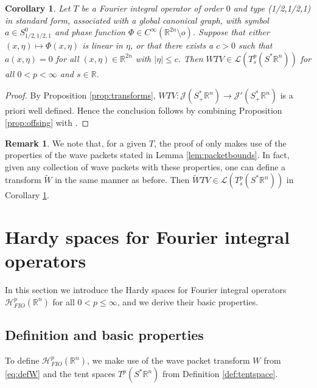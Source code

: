 \documentclass{amsart}
\newcommand {\Hp}{\mathcal{H}^{p}_{FIO}(\Rn)}
\newcommand {\J}{\mathcal{J}}
\newcommand {\La}{\mathcal{L}}
\newcommand {\R}{\mathbb R}
\newcommand {\Rn}{\mathbb{R}^{n}}
\newcommand {\Sp}{S^{*}\Rn}
\newcommand {\Spp}{S^{*}_{+}\Rn}
\newcommand {\wt}{\widetilde}
\newtheorem{corollary}[theorem]{Corollary}
\theoremstyle{definition}
\newtheorem{remark}[theorem]{Remark}
\numberwithin{equation}{section}
\begin{document}
\begin{corollary}\label{cor:FIOtent}
Let $T$ be a Fourier integral operator of order $0$ { and type (1/2,1/2,1)} in standard form, associated with a global canonical graph, with symbol $a\in S^{0}_{1/2,1/2,1}$ and phase function $\Phi\in C^{\infty}(\R^{2n}\setminus o)$. Suppose that either $(x,\eta)\mapsto \Phi(x,\eta)$ is linear in $\eta$, or that there exists a $c>0$ such that $a(x,\eta)=0$ for all $(x,\eta)\in\R^{2n}$ with $|\eta|\leq c$. Then $WTV\in \La(T^{p}_{s}(\Sp))$ for all $0<p<\infty$ and $s\in\R$. 
\end{corollary}
\begin{proof}
By Proposition \ref{prop:transforms}, $WTV:\J(\Spp)\to\J'(\Spp)$ is a priori well defined. Hence the conclusion follows by combining Proposition \ref{prop:offsing} with \cite[Lemma 2.13 and Corollary 5.2]{HaPoRo20}.
\end{proof}

\begin{remark}\label{rem:FIOtentother}
We note that, for a given $T$, the proof of \cite[Corollary 5.2]{HaPoRo20} only makes use of the properties of the wave packets stated in Lemma \ref{lem:packetbounds}. In fact, given any collection of wave packets with these properties, one can define a transform $\wt{W}$ in the same manner as before. Then $\wt{W}TV\in \La(T^{p}_{s}(\Sp))$ in Corollary \ref{cor:FIOtent}.
\end{remark}










\section{Hardy spaces for Fourier integral operators}\label{sec:HpFIO}

In this section we introduce the Hardy spaces for Fourier integral operators $\Hp$ for all $0<p\leq \infty$, and we derive their basic properties.

\subsection{Definition and basic properties}\label{subsec:defHpFIO}

To define $\Hp$, %
we make use of the wave packet transform $W$ from \eqref{eq:defW} and the tent spaces $T^{p}(\Sp)$ from Definition \ref{def:tentspace}.
\end{document}
